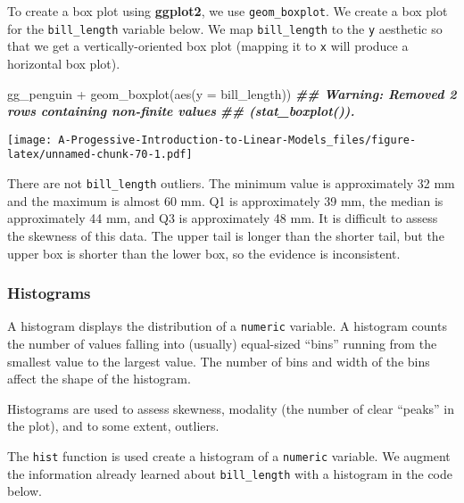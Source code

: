 \documentclass[
]{book}
\newenvironment{Shaded}{\begin{snugshade}}{\end{snugshade}}
\newcommand{\AttributeTok}[1]{\textcolor[rgb]{0.77,0.63,0.00}{#1}}
\newcommand{\DocumentationTok}[1]{\textcolor[rgb]{0.56,0.35,0.01}{\textbf{\textit{#1}}}}
\newcommand{\FunctionTok}[1]{\textcolor[rgb]{0.00,0.00,0.00}{#1}}
\newcommand{\NormalTok}[1]{#1}
\newcommand{\SpecialCharTok}[1]{\textcolor[rgb]{0.00,0.00,0.00}{#1}}
\theoremstyle{definition}
\theoremstyle{definition}
\theoremstyle{definition}
\theoremstyle{definition}
\theoremstyle{remark}
\begin{document}
To create a box plot using \textbf{ggplot2}, we use \texttt{geom\_boxplot}. We create a box plot for the \texttt{bill\_length} variable below. We map \texttt{bill\_length} to the \texttt{y} aesthetic so that we get a vertically-oriented box plot (mapping it to \texttt{x} will produce a horizontal box plot).

\begin{Shaded}
\begin{Highlighting}[]
\NormalTok{gg\_penguin }\SpecialCharTok{+} \FunctionTok{geom\_boxplot}\NormalTok{(}\FunctionTok{aes}\NormalTok{(}\AttributeTok{y =}\NormalTok{ bill\_length))}
\DocumentationTok{\#\# Warning: Removed 2 rows containing non{-}finite values}
\DocumentationTok{\#\# (\textasciigrave{}stat\_boxplot()\textasciigrave{}).}
\end{Highlighting}
\end{Shaded}

\texttt{[image: A-Progessive-Introduction-to-Linear-Models\_files/figure-latex/unnamed-chunk-70-1.pdf]}

There are not \texttt{bill\_length} outliers. The minimum value is approximately 32 mm and the maximum is almost 60 mm. Q1 is approximately 39 mm, the median is approximately 44 mm, and Q3 is approximately 48 mm. It is difficult to assess the skewness of this data. The upper tail is longer than the shorter tail, but the upper box is shorter than the lower box, so the evidence is inconsistent.

\hypertarget{histograms}{%
\subsubsection{Histograms}\label{histograms}}

A histogram displays the distribution of a \texttt{numeric} variable. A histogram counts the number of values falling into (usually) equal-sized ``bins'' running from the smallest value to the largest value. The number of bins and width of the bins affect the shape of the histogram.

Histograms are used to assess skewness, modality (the number of clear ``peaks'' in the plot), and to some extent, outliers.

The \texttt{hist} function is used create a histogram of a \texttt{numeric} variable. We augment the information already learned about \texttt{bill\_length} with a histogram in the code below.

\begin{Shaded}
\end{Shaded}
\end{document}
